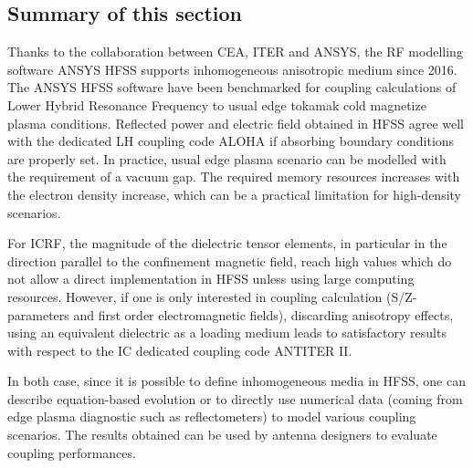 \subsection{Summary of this section}
Thanks to the collaboration between CEA, ITER and ANSYS, the RF modelling software ANSYS HFSS supports inhomogeneous anisotropic medium since 2016. The ANSYS HFSS software have been benchmarked for coupling calculations of Lower Hybrid Resonance Frequency to usual edge tokamak cold magnetize plasma conditions. Reflected power and electric field obtained in HFSS agree well with the dedicated LH coupling code ALOHA if absorbing boundary conditions are properly set. In practice, usual edge plasma scenario can be modelled with the requirement of a vacuum gap. The  required memory resources increases with the electron density increase, which can be a practical limitation for high-density scenarios.

For ICRF, the magnitude of the dielectric tensor elements, in particular in the direction parallel to the confinement magnetic field, reach high values which do not allow a direct implementation in HFSS unless using large computing resources. However, if one is only interested in coupling calculation (S/Z-parameters and first order electromagnetic fields), discarding anisotropy effects, using an equivalent dielectric as a loading medium leads to satisfactory results with respect to the IC dedicated coupling code ANTITER II. 

In both case, since it is possible to define inhomogeneous media in HFSS, one can describe equation-based evolution or to directly use numerical data (coming from edge plasma diagnostic such as reflectometers) to model various coupling scenarios. The results obtained can be used by antenna designers to evaluate coupling performances. 
